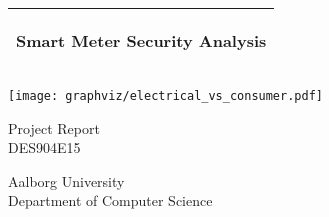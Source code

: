 %
%
%
%
%
\begin{titlepage}
  \addtolength{\hoffset}{0.5\evensidemargin-0.5\oddsidemargin} %
  \noindent%
  \begin{tabular}{@{}p{\textwidth}@{}}
    \toprule[2pt]
    \midrule
    \vspace{0.2cm}
    \begin{center}
    \Huge{\textbf{
      Smart Meter Security Analysis%
    }}
    \end{center}
    \vspace{0.2cm}\\
    \midrule
    \toprule[2pt]
  \end{tabular}
  \vspace{1 cm}
  \begin{center}
    \vspace{0.5cm}\texttt{[image: graphviz/electrical\_vs\_consumer.pdf]}
  \end{center}
  \vfill
  \begin{center}
    {\large
      Project Report%
    }\\
    \vspace{0.2cm}
    {\Large
      DES904E15%
    }
  \end{center}
  \begin{center}
  Aalborg University\\
  Department of Computer Science
  \end{center}
\end{titlepage}
\clearpage
